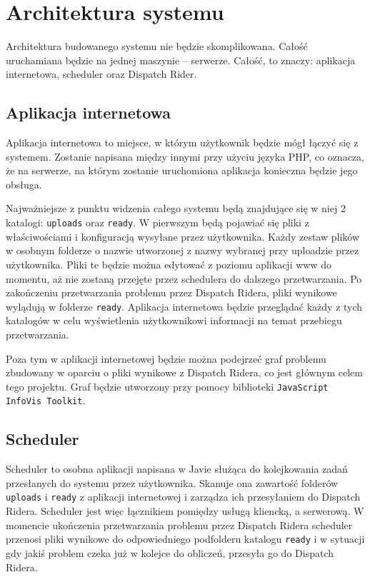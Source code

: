 \chapter{Architektura systemu}
Architektura budowanego systemu nie będzie skomplikowana. Całość uruchamiana
będzie na jednej maszynie -- serwerze. Całość, to znaczy: aplikacja internetowa, scheduler
oraz Dispatch Rider.
\section{Aplikacja internetowa}
Aplikacja internetowa to miejsce, w którym użytkownik będzie mógł łączyć się z systemem.
Zostanie napisana między innymi przy użyciu języka PHP, co oznacza, że na serwerze,
na którym zostanie uruchomiona aplikacja konieczna będzie jego obsługa.

Najważniejsze z punktu widzenia całego systemu będą znajdujące się w niej 2 katalogi: \texttt{uploads}
oraz \texttt{ready}. W pierwszym będą pojawiać się pliki z właściwościami i konfiguracją wysyłane przez 
użytkownika. Każdy zestaw plików w osobnym folderze o nazwie utworzonej z nazwy wybranej przy uploadzie
przez użytkownika. Pliki te będzie można edytować z poziomu aplikacji www do momentu, aż nie zostaną
przejęte przez schedulera do dalszego przetwarzania. Po zakończeniu przetwarzania problemu przez Dispatch
Ridera, pliki wynikowe wylądują w folderze \texttt{ready}. Aplikacja internetowa będzie przeglądać
każdy z tych katalogów w celu wyświetlenia użytkownikowi informacji na temat przebiegu przetwarzania.

Poza tym w aplikacji internetowej będzie można podejrzeć graf problemu zbudowany w oparciu o pliki
wynikowe z Dispatch Ridera, co jest głównym celem tego projektu. Graf będzie utworzony przy pomocy
biblioteki \texttt{JavaScript InfoVis Toolkit}.

\section{Scheduler}
Scheduler to osobna aplikacji napisana w Javie służąca do kolejkowania zadań przesłanych do systemu
przez użytkownika. Skanuje ona zawartość folderów \texttt{uploads} i \texttt{ready} z aplikacji internetowej
i zarządza ich przesyłaniem do Dispatch Ridera. Scheduler jest więc łącznikiem pomiędzy usługą kliencką,
a serwerową. W momencie ukończenia przetwarzania problemu przez Dispatch Ridera scheduler przenosi pliki
wynikowe do odpowiedniego podfolderu katalogu \texttt{ready} i w sytuacji gdy jakiś problem czeka już w kolejce
do obliczeń, przesyła go do Dispatch Ridera.

